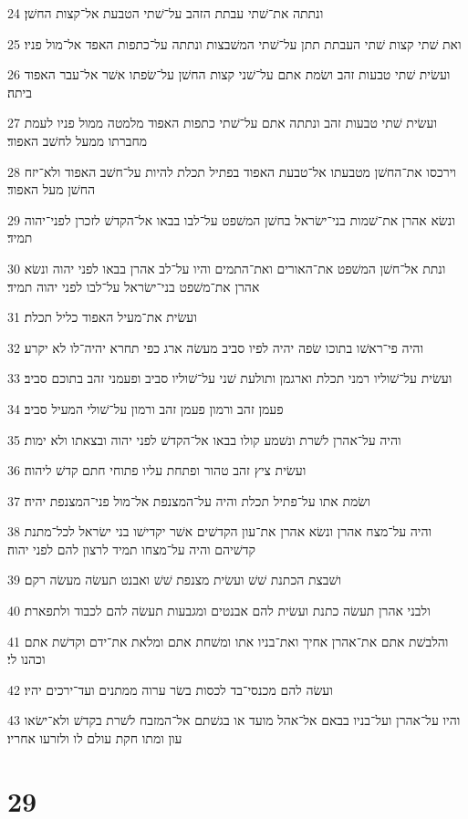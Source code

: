 \par 24 ונתתה את־שׁתי עבתת הזהב על־שׁתי הטבעת אל־קצות החשׁן׃
\par 25 ואת שׁתי קצות שׁתי העבתת תתן על־שׁתי המשׁבצות ונתתה על־כתפות האפד אל־מול פניו׃
\par 26 ועשׂית שׁתי טבעות זהב ושׂמת אתם על־שׁני קצות החשׁן על־שׂפתו אשׁר אל־עבר האפוד ביתה׃
\par 27 ועשׂית שׁתי טבעות זהב ונתתה אתם על־שׁתי כתפות האפוד מלמטה ממול פניו לעמת מחברתו ממעל לחשׁב האפוד׃
\par 28 וירכסו את־החשׁן מטבעתו אל־טבעת האפוד בפתיל תכלת להיות על־חשׁב האפוד ולא־יזח החשׁן מעל האפוד׃
\par 29 ונשׂא אהרן את־שׁמות בני־ישׂראל בחשׁן המשׁפט על־לבו בבאו אל־הקדשׁ לזכרן לפני־יהוה תמיד׃
\par 30 ונתת אל־חשׁן המשׁפט את־האורים ואת־התמים והיו על־לב אהרן בבאו לפני יהוה ונשׂא אהרן את־משׁפט בני־ישׂראל על־לבו לפני יהוה תמיד׃
\par 31 ועשׂית את־מעיל האפוד כליל תכלת׃
\par 32 והיה פי־ראשׁו בתוכו שׂפה יהיה לפיו סביב מעשׂה ארג כפי תחרא יהיה־לו לא יקרע׃
\par 33 ועשׂית על־שׁוליו רמני תכלת וארגמן ותולעת שׁני על־שׁוליו סביב ופעמני זהב בתוכם סביב׃
\par 34 פעמן זהב ורמון פעמן זהב ורמון על־שׁולי המעיל סביב׃
\par 35 והיה על־אהרן לשׁרת ונשׁמע קולו בבאו אל־הקדשׁ לפני יהוה ובצאתו ולא ימות׃
\par 36 ועשׂית ציץ זהב טהור ופתחת עליו פתוחי חתם קדשׁ ליהוה׃
\par 37 ושׂמת אתו על־פתיל תכלת והיה על־המצנפת אל־מול פני־המצנפת יהיה׃
\par 38 והיה על־מצח אהרן ונשׂא אהרן את־עון הקדשׁים אשׁר יקדישׁו בני ישׂראל לכל־מתנת קדשׁיהם והיה על־מצחו תמיד לרצון להם לפני יהוה׃
\par 39 ושׁבצת הכתנת שׁשׁ ועשׂית מצנפת שׁשׁ ואבנט תעשׂה מעשׂה רקם׃
\par 40 ולבני אהרן תעשׂה כתנת ועשׂית להם אבנטים ומגבעות תעשׂה להם לכבוד ולתפארת׃
\par 41 והלבשׁת אתם את־אהרן אחיך ואת־בניו אתו ומשׁחת אתם ומלאת את־ידם וקדשׁת אתם וכהנו לי׃
\par 42 ועשׂה להם מכנסי־בד לכסות בשׂר ערוה ממתנים ועד־ירכים יהיו׃
\par 43 והיו על־אהרן ועל־בניו בבאם אל־אהל מועד או בגשׁתם אל־המזבח לשׁרת בקדשׁ ולא־ישׂאו עון ומתו חקת עולם לו ולזרעו אחריו׃

\chapter{29}

